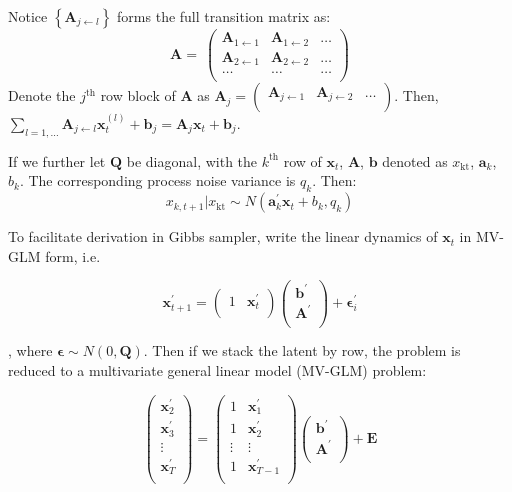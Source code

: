 \documentclass[]{article}
\begin{document}
Notice \(\left\{ \mathbf{A}_{j \leftarrow l} \right\}\) forms the full transition matrix as:
\[\mathbf{A} = \ \begin{pmatrix}
	\mathbf{A}_{1 \leftarrow 1} & \mathbf{A}_{1 \leftarrow 2} & \ldots \\
	\mathbf{A}_{2 \leftarrow 1} & \mathbf{A}_{2 \leftarrow 2} & \ldots \\
	\ldots\  & \ldots & \ldots \\
\end{pmatrix}\]
Denote the \(j^{\text{th}}\) row block of \(\mathbf{A}\) as
\(\mathbf{A}_{j} = \begin{pmatrix}
	\mathbf{A}_{j \leftarrow 1} & \mathbf{A}_{j \leftarrow 2} & \ldots \\
\end{pmatrix}\). Then,
\(\sum_{l = 1,\ldots}^{}\mathbf{A}_{j \leftarrow l}\mathbf{x}_{t}^{(l)} + \mathbf{b}_{j}\mathbf{=}\mathbf{A}_{j}\mathbf{x}_{t} + \mathbf{b}_{j}\).

If we further let \(\mathbf{Q}\) be diagonal, with the
\(k^{\text{th}}\) row of \(\mathbf{x}_{t}\), \(\mathbf{A}\),
\(\mathbf{b}\) denoted as \(x_{\text{kt}}\), \(\mathbf{a}_{k}\), \(b_{k}\). The corresponding process noise variance is \(q_{k}\). Then:
\[x_{k,t + 1}|x_{\text{kt}} \sim N\left( \mathbf{a}_{k}^{'}\mathbf{x}_{t} + b_{k},q_{k} \right)\]

To facilitate derivation in Gibbs sampler, write the linear dynamics of
\(\mathbf{x}_{t}\) in MV-GLM form, i.e.

\[\mathbf{x}_{t + 1}^{'} = \begin{pmatrix}
	1 & \mathbf{x}_{t}^{'} \\
\end{pmatrix}\begin{pmatrix}
	\mathbf{b}^{'} \\
	\mathbf{A}^{'} \\
\end{pmatrix} + \mathbf{\epsilon}_{i}^{'}\]

, where \(\mathbf{\epsilon} \sim N(0,\mathbf{Q})\). Then if we stack the
latent by row, the problem is reduced to a multivariate general linear model (MV-GLM) problem:

\[\begin{pmatrix}
	\mathbf{x}_{2}^{'} \\
	\mathbf{x}_{3}^{'} \\
	\vdots \\
	\mathbf{x}_{T}^{'} \\
\end{pmatrix} = \begin{pmatrix}
	1 & \mathbf{x}_{1}^{'} \\
	1 & \mathbf{x}_{2}^{'} \\
	\vdots & \vdots \\
	1 & \mathbf{x}_{T - 1}^{'} \\
\end{pmatrix}\begin{pmatrix}
	\mathbf{b}^{'} \\
	\mathbf{A}^{'} \\
\end{pmatrix} + \mathbf{E}\]
\end{document}
